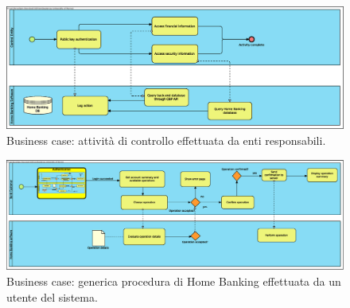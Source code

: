 \documentclass[10pt]{softeng} %
\begin{document}
\begin{figure}[hbt]
	\centering
	\includegraphics[width=\textheight, angle=90]{Images/Home_Banking_control_activity.eps}
	\caption{Business case: attivit\`a di controllo effettuata da enti responsabili.}
	\label{fig:business_case_control_activity}
\end{figure}

\begin{figure}[hbt]
	\centering
	\includegraphics[width=\textheight, angle=90]{Images/Home_Banking_generic_action.eps}
	\caption{Business case: generica procedura di Home Banking effettuata da un utente del sistema.}
	\label{fig:business_case_generic_operation}
\end{figure}
\end{document}
